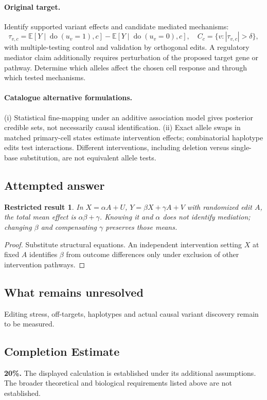 \documentclass[11pt]{article}
\newcommand{\E}{\mathbb E}
\providecommand{\E}{\mathbb E}
\newtheorem{attemptresult}{Restricted result}[section]
\begin{document}
\paragraph{Original target.}
Identify supported variant effects and candidate mediated mechanisms:
\[
\tau_{v,c}=\E[Y\mid\operatorname{do}(u_v=1),c]-\E[Y\mid\operatorname{do}(u_v=0),c],
\quad C_c=\{v:|\tau_{v,c}|>\delta\},
\]
with multiple-testing control and validation by orthogonal edits. A regulatory mediator claim additionally requires perturbation of the proposed target gene or pathway. Determine which alleles affect the chosen cell response and through which tested mechanisms.
\paragraph{Catalogue alternative formulations.}
(i) Statistical fine-mapping under an additive association model gives posterior credible sets, not necessarily causal identification. (ii) Exact allele swaps in matched primary-cell states estimate intervention effects; combinatorial haplotype edits test interactions. Different interventions, including deletion versus single-base substitution, are not equivalent allele tests.
\subsection{Attempted answer}
\begin{attemptresult}
In $X=\alpha A+U$, $Y=\beta X+\gamma A+V$ with randomized edit $A$, the total mean effect is $\alpha\beta+\gamma$. Knowing it and $\alpha$ does not identify mediation; changing $\beta$ and compensating $\gamma$ preserves those means.
\end{attemptresult}
\begin{proof}
Substitute structural equations. An independent intervention setting $X$ at fixed $A$ identifies $\beta$ from outcome differences only under exclusion of other intervention pathways.
\end{proof}
\subsection{What remains unresolved}
Editing stress, off-targets, haplotypes and actual causal variant discovery remain to be measured.
\subsection{Completion Estimate}
\textbf{20\%.} The displayed calculation is established under its additional assumptions. The broader theoretical and biological requirements listed above are not established.
\end{document}
